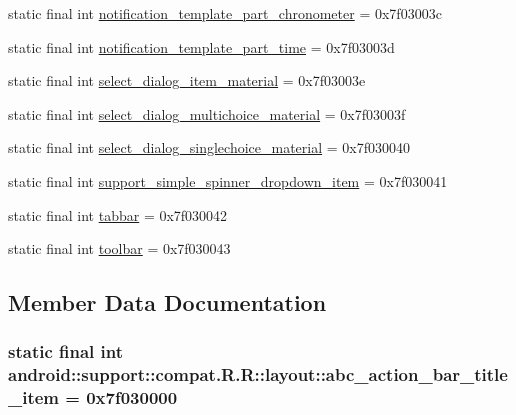 \begin{CompactItemize}
static final int \hyperlink{classandroid_1_1support_1_1compat_1_1_r_1_1layout_dc80f3511ddd9652c9f8154b774b8a37}{notification\_\-template\_\-part\_\-chronometer} = 0x7f03003c
\item 
static final int \hyperlink{classandroid_1_1support_1_1compat_1_1_r_1_1layout_f47d9d69247113c0576a48ce4bb2c609}{notification\_\-template\_\-part\_\-time} = 0x7f03003d
\item 
static final int \hyperlink{classandroid_1_1support_1_1compat_1_1_r_1_1layout_bc4e4418e69a89828c1244282a35b7bb}{select\_\-dialog\_\-item\_\-material} = 0x7f03003e
\item 
static final int \hyperlink{classandroid_1_1support_1_1compat_1_1_r_1_1layout_50ad6639be541d1fe75eb7a7acd3bea1}{select\_\-dialog\_\-multichoice\_\-material} = 0x7f03003f
\item 
static final int \hyperlink{classandroid_1_1support_1_1compat_1_1_r_1_1layout_1874fb7501854bcdcd51a1e488fe1bd3}{select\_\-dialog\_\-singlechoice\_\-material} = 0x7f030040
\item 
static final int \hyperlink{classandroid_1_1support_1_1compat_1_1_r_1_1layout_929cea810385e067b63dbde88c4a8778}{support\_\-simple\_\-spinner\_\-dropdown\_\-item} = 0x7f030041
\item 
static final int \hyperlink{classandroid_1_1support_1_1compat_1_1_r_1_1layout_0882d5bc699073d43912fb0b37a6fb3d}{tabbar} = 0x7f030042
\item 
static final int \hyperlink{classandroid_1_1support_1_1compat_1_1_r_1_1layout_31dd18676b0833427a9e301b70df5a85}{toolbar} = 0x7f030043
\end{CompactItemize}


\subsection{Member Data Documentation}
\hypertarget{classandroid_1_1support_1_1compat_1_1_r_1_1layout_13e416c756e64814c7e7748d53d300ff}{
\subsubsection[{abc\_\-action\_\-bar\_\-title\_\-item}]{\setlength{\rightskip}{0pt plus 5cm}static final int android::support::compat.R.R::layout::abc\_\-action\_\-bar\_\-title\_\-item = 0x7f030000}}
\label{classandroid_1_1support_1_1compat_1_1_r_1_1layout_13e416c756e64814c7e7748d53d300ff}


